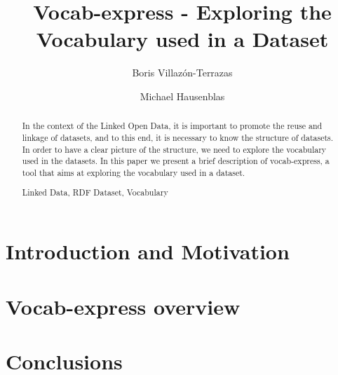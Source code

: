 \documentclass{llncs}
\newcommand{\keywords}[1]{\par\addvspace\baselineskip
\noindent\keywordname\enspace\ignorespaces#1}
\begin{document}

\title{Vocab-express - Exploring the Vocabulary used in a Dataset}


%
%
\author{Boris Villaz\'{o}n-Terrazas\and Michael Hausenblas}
%




%
%

\maketitle
\begin{abstract}
In the context of the Linked Open Data, it is important to promote the reuse and linkage of datasets, and to this end, it is necessary to know the structure of datasets. In order to have a clear picture of the structure, we need to explore the vocabulary used in the datasets. In this paper we present a brief description of vocab-express, a tool that aims at exploring the vocabulary used in a dataset.
\keywords{Linked Data, RDF Dataset, Vocabulary} 
\end{abstract}

\vspace{-2mm}
\section{Introduction and Motivation}\label{sec:introduction}


\vspace{-2mm}
\section{Vocab-express overview}\label{sec:vocab}


\vspace{-4mm}
\section{Conclusions}\label{sec:conclusions}


 

\vspace{-2mm}
 
 
\end{document}
